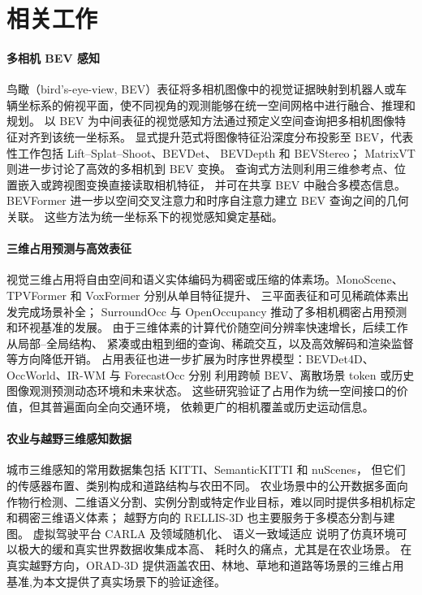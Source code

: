 \section{相关工作}\label{sec:related}

\paragraph{多相机 BEV 感知}
鸟瞰（bird's-eye-view, BEV）表征将多相机图像中的视觉证据映射到机器人或车辆坐标系的俯视平面，使不同视角的观测能够在统一空间网格中进行融合、推理和规划。
以 BEV 为中间表征的视觉感知方法通过预定义空间查询把多相机图像特征对齐到该统一坐标系。
显式提升范式将图像特征沿深度分布投影至 BEV，代表性工作包括 Lift--Splat--Shoot、BEVDet、
BEVDepth 和 BEVStereo\cite{philion2020lift,huang2021bevdet,li2022bevdepth,li2022bevstereo}；
MatrixVT 则进一步讨论了高效的多相机到 BEV 变换\cite{zhou2022matrixvt}。
查询式方法则利用三维参考点、位置嵌入或跨视图变换直接读取相机特征\cite{wang2022detr3d,li2022petr,liu2023petrv2,li2023fbbev}，
并可在共享 BEV 中融合多模态信息\cite{liu2023bevfusion}。
BEVFormer 进一步以空间交叉注意力和时序自注意力建立 BEV 查询之间的几何关联\cite{li2022bevformer}。
这些方法为统一坐标系下的视觉感知奠定基础。

\paragraph{三维占用预测与高效表征}
视觉三维占用将自由空间和语义实体编码为稠密或压缩的体素场。MonoScene、TPVFormer 和 VoxFormer 分别从单目特征提升、
三平面表征和可见稀疏体素出发完成场景补全\cite{cao2022monoscene,huang2023tpvformer,li2023voxformer}；
SurroundOcc 与 OpenOccupancy 推动了多相机稠密占用预测和环视基准的发展\cite{wei2023surroundocc,wang2023openoccupancy}。
由于三维体素的计算代价随空间分辨率快速增长，后续工作从局部--全局结构、
紧凑或由粗到细的查询、稀疏交互，以及高效解码和渲染监督等方向降低开销\cite{zhang2023occformer,ma2024cotr,wang2024panoocc,liu2024sparseocc,tang2024sparseocc,yu2023flashocc,pan2024renderocc}。
占用表征也进一步扩展为时序世界模型：BEVDet4D、OccWorld、IR-WM 与 ForecastOcc 分别
利用跨帧 BEV、离散场景 token 或历史图像观测预测动态环境和未来状态\cite{huang2022bevdet4d,zheng2024occworld,mei2025irwm,mohan2026forecastocc}。
这些研究验证了占用作为统一空间接口的价值，但其普遍面向全向交通环境，
依赖更广的相机覆盖或历史运动信息。

\paragraph{农业与越野三维感知数据}
城市三维感知的常用数据集包括 KITTI\cite{geiger2012kitti}、SemanticKITTI\cite{behley2019semantickitti} 和 nuScenes\cite{caesar2020nuscenes}，
但它们的传感器布置、类别构成和道路结构与农田不同。
农业场景中的公开数据多面向作物行检测、二维语义分割、实例分割或特定作业目标，难以同时提供多相机标定和稠密三维语义体素；
越野方向的 RELLIS-3D\cite{jiang2020rellis} 也主要服务于多模态分割与建图。
虚拟驾驶平台 CARLA\cite{dosovitskiy2017carla} 及领域随机化\cite{tobin2017domainrandomization,peng2018sim2real}、
语义一致域适应\cite{hoffman2018cycada} 说明了仿真环境可以极大的缓和真实世界数据收集成本高、
耗时久的痛点，尤其是在农业场景。
在真实越野方向，ORAD-3D 提供涵盖农田、林地、草地和道路等场景的三维占用
基准\cite{chen2025orad3d},为本文提供了真实场景下的验证途径。
